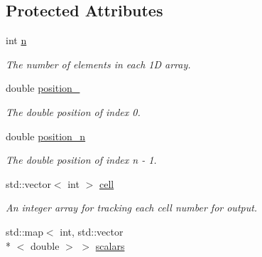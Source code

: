 \subsection*{Protected Attributes}
\begin{DoxyCompactItemize}
\item 
\hypertarget{classone__d_1_1element_abffb6235b8bcf6e2085ad7dde0c5be3c}{int \hyperlink{classone__d_1_1element_abffb6235b8bcf6e2085ad7dde0c5be3c}{n}}\label{classone__d_1_1element_abffb6235b8bcf6e2085ad7dde0c5be3c}

\begin{DoxyCompactList}\small\item\em The number of elements in each 1\-D array. \end{DoxyCompactList}\item 
\hypertarget{classone__d_1_1element_ad3c5a49b063ecaa54da15a5ff149ad39}{double \hyperlink{classone__d_1_1element_ad3c5a49b063ecaa54da15a5ff149ad39}{position\-\_}}\label{classone__d_1_1element_ad3c5a49b063ecaa54da15a5ff149ad39}

\begin{DoxyCompactList}\small\item\em The double position of index 0. \end{DoxyCompactList}\item 
\hypertarget{classone__d_1_1element_aa9c1febb4303b52f9390e0b198bd8334}{double \hyperlink{classone__d_1_1element_aa9c1febb4303b52f9390e0b198bd8334}{position\-\_\-n}}\label{classone__d_1_1element_aa9c1febb4303b52f9390e0b198bd8334}

\begin{DoxyCompactList}\small\item\em The double position of index n -\/ 1. \end{DoxyCompactList}\item 
\hypertarget{classone__d_1_1element_abc6399df360c45095f825f8cc33c4016}{std\-::vector$<$ int $>$ \hyperlink{classone__d_1_1element_abc6399df360c45095f825f8cc33c4016}{cell}}\label{classone__d_1_1element_abc6399df360c45095f825f8cc33c4016}

\begin{DoxyCompactList}\small\item\em An integer array for tracking each cell number for output. \end{DoxyCompactList}\item 
\hypertarget{classone__d_1_1element_a5a748296569f85cf4d904e0d17aa6388}{std\-::map$<$ int, std\-::vector\\*
$<$ double $>$ $>$ \hyperlink{classone__d_1_1element_a5a748296569f85cf4d904e0d17aa6388}{scalars}}\label{classone__d_1_1element_a5a748296569f85cf4d904e0d17aa6388}


\end{DoxyCompactItemize}
